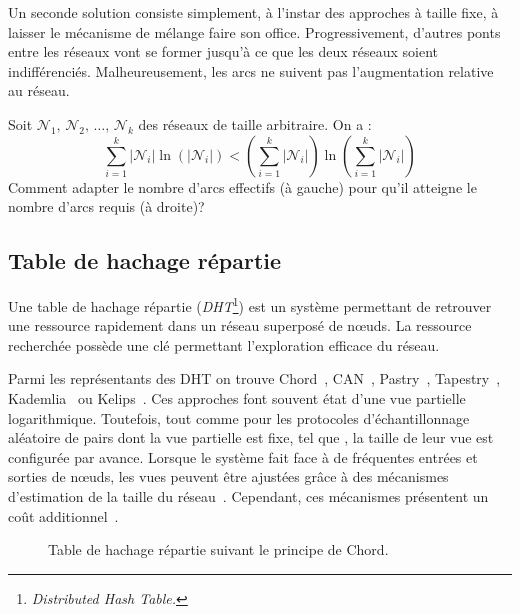 \noindent Un seconde solution consiste simplement, à l'instar des approches à
taille fixe, à laisser le mécanisme de mélange faire son office. Progressivement,
d'autres ponts entre les réseaux vont se former jusqu'à ce que les deux réseaux
soient indifférenciés. Malheureusement, les arcs ne suivent pas l'augmentation
relative au réseau.

\begin{problem}
  Soit $\mathcal{N}_1,\, \mathcal{N}_2,\, \ldots ,\, \mathcal{N}_k$ des réseaux
  de taille arbitraire. On a : \vspace{-5pt}
\begin{equation}
  \sum\limits_{i = 1}^k |\mathcal{N}_i|\ln (|\mathcal{N}_i|) < (\sum\limits_{i = 1}^k |\mathcal{N}_i|)\ln{(\sum\limits_{i=1}^k |\mathcal{N}_i|)}
\end{equation}
Comment adapter le nombre d'arcs effectifs (à gauche) pour qu'il atteigne le
nombre d'arcs requis (à droite)?
\end{problem}


\subsection{Table de hachage répartie}

Une table de hachage répartie (\emph{DHT}\footnote{\emph{Distributed Hash
    Table.}}) est un système permettant de retrouver une ressource rapidement
dans un réseau superposé de nœuds. La ressource recherchée possède une clé
permettant l'exploration efficace du réseau.

Parmi les représentants des DHT on trouve Chord~\cite{stoica2001chord},
CAN~\cite{ratnasamy2001scalable}, Pastry~\cite{rowstron2001pastry},
Tapestry~\cite{zhao2006tapestry}, Kademlia~\cite{maymounkov2002kademlia} ou
Kelips~\cite{gupta2003kelips}.  Ces approches font souvent état d'une vue
partielle logarithmique.  Toutefois, tout comme pour les protocoles
d'échantillonnage aléatoire de pairs dont la vue partielle est fixe, tel que
\CYCLON, la taille de leur vue est configurée par avance. Lorsque le système
fait face à de fréquentes entrées et sorties de nœuds, les vues peuvent être
ajustées grâce à des mécanismes d'estimation de la taille du
réseau~\cite{camarillo2014self, ghinita2006adaptive}. Cependant, ces mécanismes
présentent un coût additionnel~\cite{ghinita2006adaptive}.

\begin{figure}
  \begin{center}
    
    \caption[Table de hachage répartie]
    {\label{conclu:fig:dhtexample}Table de hachage répartie suivant le principe
      de Chord.}
  \end{center}
\end{figure}

